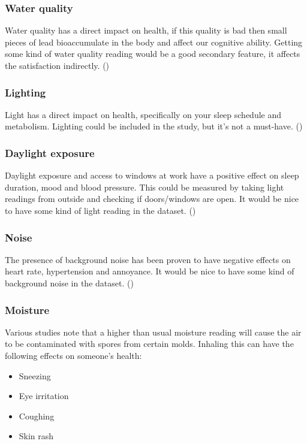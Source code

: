 \documentclass[12pt,a4paper]{article}
\begin{document}
\subsubsection{Water quality}
Water quality has a direct impact on health, if this quality is bad then small pieces of lead bioaccumulate in the body and affect our cognitive ability. Getting some kind of water quality reading would be a good secondary feature, it affects the satisfaction indirectly.
(\cite{9foundations})

\subsubsection{Lighting}
Light has a direct impact on health, specifically on your sleep schedule and metabolism. Lighting could be included in the study, but it's not a must-have. 
(\cite{9foundations})

\subsubsection{Daylight exposure}
Daylight exposure and access to windows at work have a positive effect on sleep duration, mood and blood pressure. This could be measured by taking light readings from outside and checking if doors/windows are open. It would be nice to have some kind of light reading in the dataset.
(\cite{9foundations})

\subsubsection{Noise}
The presence of background noise has been proven to have negative effects on heart rate, hypertension and annoyance. It would be nice to have some kind of background noise in the dataset.
(\cite{9foundations})

\subsubsection{Moisture}
Various studies note that a higher than usual moisture reading will cause the air to be contaminated with spores from certain molds. Inhaling this can have the following effects on someone's health:

\begin{itemize}
	\item Sneezing
	\item Eye irritation
	\item Coughing
	\item Skin rash
\end{itemize}
\end{document}
